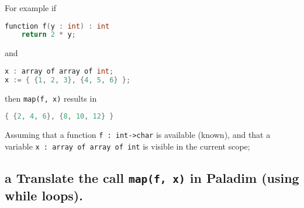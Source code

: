 \documentclass[11pt,a4paper]{article}
\begin{document}
For example if
\begin{lstlisting}[language=C]
function f(y : int) : int
	return 2 * y;
\end{lstlisting}
and 
\begin{lstlisting}[language=C]
x : array of array of int;
x := { {1, 2, 3}, {4, 5, 6} };
\end{lstlisting}
then {\tt map(f, x)} results in
\begin{lstlisting}[language=C]
{ {2, 4, 6}, {8, 10, 12} }
\end{lstlisting}

Assuming that a function {\tt f : int->char} is available (known), and that a
variable {\tt x : array of array of int} is visible in the current scope;

\subsection*{a \mdseries Translate the call {\tt map(f, x)} in Paladim (using
while loops).}

\end{document}
